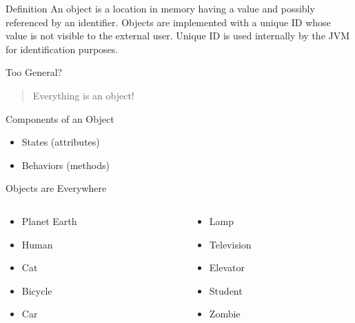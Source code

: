 \documentclass[10pt, compress]{beamer}
\begin{document}
\begin{slide}
	\begin{block}{Definition}
		An object is a location in memory having a value and possibly referenced by an identifier.
		Objects are implemented with a unique ID whose value is not visible to the external user.
		Unique ID is used internally by the JVM for identification purposes.
	\end{block}
	\begin{block}{Too General?}
		\begin{quote}
			Everything is an object!
		\end{quote}
	\end{block}
\end{slide}

\begin{slide}
	\begin{block}{Components of an Object}
		\begin{itemize}
			\item[] States (attributes)
			\item[] Behaviors (methods)
		\end{itemize}
	\end{block}
\end{slide}

\begin{slide}
	\begin{block}{Objects are Everywhere}
		\begin{columns}
			\begin{column}{0.5\textwidth}
				\begin{itemize}
					\item[] Planet Earth
					\item[] Human
					\item[] Cat
					\item[] Bicycle
					\item[] Car
				\end{itemize}
			\end{column}
			\begin{column}{0.5\textwidth}
				\begin{itemize}
					\item[] Lamp
					\item[] Television
					\item[] Elevator
					\item[] Student
					\item[] Zombie
				\end{itemize}
			\end{column}
		\end{columns}
	\end{block}
\end{slide}
\end{document}
